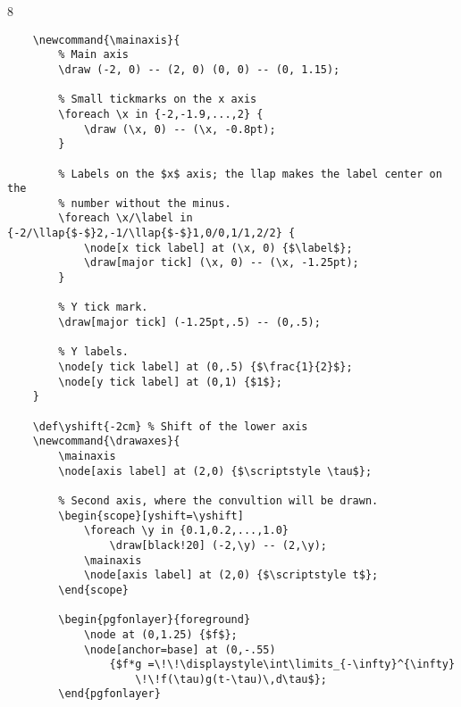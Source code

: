     \begin{animateinline}[controls,
        autoplay,buttonsize=1.2em,
        buttonbg=0.6:0.6:1,buttonfg=0.2:0.2:1,
        begin={\begin{tikzpicture}[scale=2]\drawaxes},
        end={\end{tikzpicture}}]{8}

        \xdef\pos{-2}
        \whiledo{\lengthtest{\pos pt < 2.1 pt}}{
            \drawg{\pos}\newframe
            \pgfmathsetmacro{\pos}{\pos + 0.1}
            \xdef\pos{\pos}
        }

        \drawg{\pos}
    \end{animateinline}

\scriptsize
\begin{lstlisting}
    \newcommand{\mainaxis}{
        % Main axis
        \draw (-2, 0) -- (2, 0) (0, 0) -- (0, 1.15);

        % Small tickmarks on the x axis
        \foreach \x in {-2,-1.9,...,2} {
            \draw (\x, 0) -- (\x, -0.8pt);
        }

        % Labels on the $x$ axis; the llap makes the label center on the
        % number without the minus.
        \foreach \x/\label in {-2/\llap{$-$}2,-1/\llap{$-$}1,0/0,1/1,2/2} {
            \node[x tick label] at (\x, 0) {$\label$};
            \draw[major tick] (\x, 0) -- (\x, -1.25pt);
        }

        % Y tick mark.
        \draw[major tick] (-1.25pt,.5) -- (0,.5);

        % Y labels.
        \node[y tick label] at (0,.5) {$\frac{1}{2}$};
        \node[y tick label] at (0,1) {$1$};
    }

    \def\yshift{-2cm} % Shift of the lower axis
    \newcommand{\drawaxes}{
        \mainaxis
        \node[axis label] at (2,0) {$\scriptstyle \tau$};

        % Second axis, where the convultion will be drawn.
        \begin{scope}[yshift=\yshift]
            \foreach \y in {0.1,0.2,...,1.0}
                \draw[black!20] (-2,\y) -- (2,\y);
            \mainaxis
            \node[axis label] at (2,0) {$\scriptstyle t$};
        \end{scope}

        \begin{pgfonlayer}{foreground}
            \node at (0,1.25) {$f$};
            \node[anchor=base] at (0,-.55)
                {$f*g =\!\!\displaystyle\int\limits_{-\infty}^{\infty}
                    \!\!f(\tau)g(t-\tau)\,d\tau$};
        \end{pgfonlayer}


\end{lstlisting}
